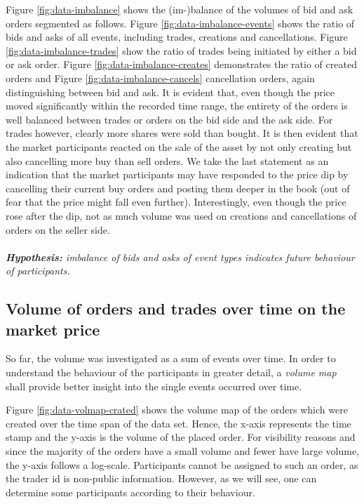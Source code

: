 Figure \ref{fig:data-imbalance} shows the (im-)balance of the volumes of bid and ask orders segmented as follows.
Figure \ref{fig:data-imbalance-events} shows the ratio of bids and asks of all events, including trades, creations and cancellations. 
Figure \ref{fig:data-imbalance-trades} show the ratio of trades being initiated by either a bid or ask order.
Figure \ref{fig:data-imbalance-creates} demonstrates the ratio of created orders and Figure \ref{fig:data-imbalance-cancels} cancellation orders, again distinguishing between bid and ask.
It is evident that, even though the price moved significantly within the recorded time range, the entirety of the orders is well balanced between trades or orders on the bid side and the ask side.
For trades however, clearly more shares were sold than bought.
It is then evident that the market participants reacted on the sale of the asset by not only creating but also cancelling more buy than sell orders.
We take the last statement as an indication that the market participants may have responded to the price dip by cancelling their current buy orders and posting them deeper in the book (out of fear that the price might fall even further).
Interestingly, even though the price rose after the dip, not as much volume was used on creations and cancellations of orders on the seller side.
\\
\\
\textit{\textbf{Hypothesis:} imbalance of bids and asks of event types indicates future behaviour of participants.}

\subsection{Volume of orders and trades over time on the market price}
\label{sec:data-hypthesis-order-trade-volume-time}

So far, the volume was investigated as a sum of events over time.
In order to understand the behaviour of the participants in greater detail, a \textit{volume map} shall provide better insight into the single events occurred over time.

Figure \ref{fig:data-volmap-crated} shows the volume map of the orders which were created over the time span of the data set.
Hence, the x-axis represents the time stamp and the y-axis is the volume of the placed order.
For visibility reasons and since the majority of the orders have a small volume and fewer have large volume, the y-axis follows a log-scale.
Participants cannot be assigned to such an order, as the trader id is non-public information.
However, as we will see, one can determine some participants according to their behaviour.

